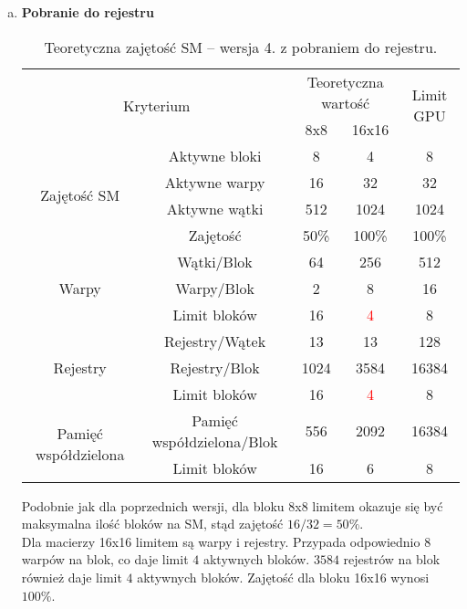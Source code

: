 \begin{enumerate}[(a)]

\item \textbf{Pobranie do rejestru} \newline

\begin{center}
\begin{table}[H]
\centering
\begin{tabular}{|c|c|c|c|c|}
\hline
\multicolumn{2}{|c|}{\multirow{2}{*}{Kryterium}} & \multicolumn{2}{c|}{Teoretyczna wartość} & \multirow{2}{*}{Limit GPU} \\ \cline{3-4}
\multicolumn{2}{|c|}{} & 8x8 & 16x16 & \\ \hline
\multirow{4}{*}{Zajętość SM} & Aktywne bloki & 8 & 4 & 8 \\ \cline{2-5}
& Aktywne warpy & 16 & 32 & 32 \\ \cline{2-5}
& Aktywne wątki & 512 & 1024 & 1024 \\ \cline{2-5}
& Zajętość & 50\% & 100\% & 100\% \\ \hline
\multirow{3}{*}{Warpy} & Wątki/Blok & 64 & 256 & 512 \\ \cline{2-5}
& Warpy/Blok & 2 & 8 & 16 \\ \cline{2-5}
& Limit bloków & 16 & \textcolor{red}{4} & 8 \\ \hline
\multirow{3}{*}{Rejestry} & Rejestry/Wątek & 13 & 13 & 128 \\ \cline{2-5}
& Rejestry/Blok & 1024 & 3584 & 16384 \\ \cline{2-5}
& Limit bloków & 16 & \textcolor{red}{4} & 8 \\ \hline
\multirow{2}{*}{Pamięć współdzielona} & Pamięć współdzielona/Blok & 556 & 2092 & 16384 \\ \cline{2-5}
& Limit bloków & 16 & 6 & 8 \\ \hline
\end{tabular}
\caption{Teoretyczna zajętość SM -- wersja 4. z pobraniem do rejestru.}
\end{table}
\end{center}

Podobnie jak dla poprzednich wersji, dla bloku 8x8 limitem okazuje się być maksymalna ilość bloków na SM, stąd zajętość $ 16 / 32 = 50\% $. \\
Dla macierzy 16x16 limitem są warpy i rejestry. Przypada odpowiednio $ 8 $ warpów na blok, co daje limit $ 4 $ aktywnych bloków. $ 3584 $ rejestrów na blok również daje limit $ 4 $ aktywnych bloków. Zajętość dla bloku 16x16 wynosi $ 100\% $. \\


\end{enumerate}
